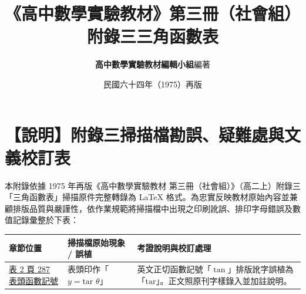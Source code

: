 \documentclass[a4paper,12pt,twoside]{article}
\title{\LARGE\textbf{《高中數學實驗教材》第三冊（社會組）}\\[0.5em] \Large\textbf{附錄三\quad 三角函數表}}
\author{\textbf{高中數學實驗教材編輯小組}\quad 編著}
\date{民國六十四年（1975）再版}
\begin{document}
\maketitle
\thispagestyle{firstpage}

\section*{【說明】附錄三掃描檔勘誤、疑難處與文義校訂表}
\label{sec:errata_notes_b3_a3}
\label{sec:current_errata}

本附錄依據 1975 年再版《高中數學實驗教材 第三冊（社會組）》（高二上）附錄三「三角函數表」掃描原件完整轉錄為 \LaTeX{} 格式。為忠實反映教材原始內容並兼顧排版品質與嚴謹性，依作業規範將掃描檔中出現之印刷訛誤、排印字母錯誤及數值記錄彙整於下表：

\begin{table}[H]
\centering
\small
\renewcommand{\arraystretch}{1.35}
\begin{tabularx}{\textwidth}{|p{3.2cm}|p{3.8cm}|X|}
\hline
\textbf{章節位置} & \textbf{掃描檔原始現象 / 誤植} & \textbf{考證說明與校訂處理} \\ \hline

\hyperref[note:b3s-a3-p287-tar]{表 2 頁 287 表頭函數記號} & 
表頭印作「$y = \text{tar }\theta$」 & 
英文正切函數記號「$\tan$」排版訛字誤植為「$\text{tar}$」。正文照原刊字樣錄入並加註說明。 \\ \hline

\end{tabularx}
\end{table}

\clearpage
\tableofcontents
\newpage


\end{document}
